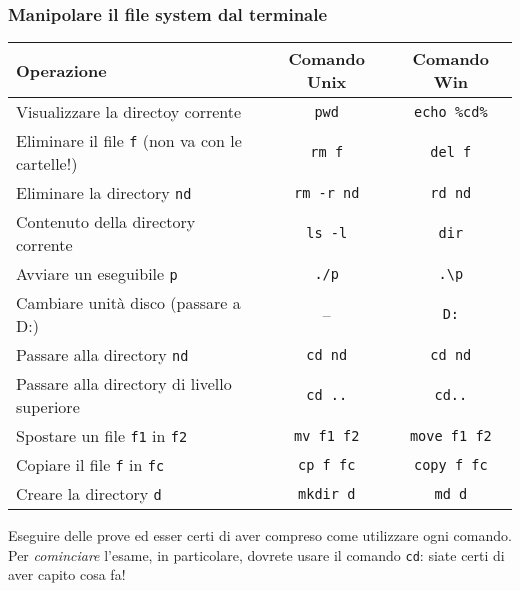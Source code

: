 \documentclass{beamer}
\begin{document}
\begin{frame}[fragile]
\label{slide:commands}
\frametitle{Manipolare il file system dal terminale}
\begin{center}
  \begin{tabular}{| l | c | c |}
    \hline
    \textbf{Operazione} & \textbf{Comando Unix} & \textbf{Comando Win} \\ \hline
    \scriptsize{}Visualizzare la directoy corrente & \texttt{pwd} & \texttt{echo \%cd\%}  \\ \hline
    \scriptsize{}Eliminare il file \texttt{f} (non va con le cartelle!) & \texttt{rm f} & \texttt{del f} \\ \hline
    \scriptsize{}Eliminare la directory \texttt{nd} & \texttt{rm -r nd} & \texttt{rd nd} \\ \hline
    \scriptsize{}Contenuto della directory corrente & \texttt{ls -l} & \texttt{dir} \\ \hline
    \scriptsize{}Avviare un eseguibile \texttt{p} & \texttt{./p} & \texttt{.\textbackslash{}p} \\ \hline
    \scriptsize{}Cambiare unità disco (passare a D:) & -- & \texttt{D:} \\ \hline
    \scriptsize{}Passare alla directory \texttt{nd} & \texttt{cd nd} & \texttt{cd nd} \\ \hline
    \scriptsize{}Passare alla directory di livello superiore & \texttt{cd ..} & \texttt{cd..} \\ \hline
    \scriptsize{}Spostare un file \texttt{f1} in \texttt{f2} & \texttt{mv f1 f2} & \texttt{move f1 f2} \\ \hline
    \scriptsize{}Copiare il file \texttt{f} in \texttt{fc} & \texttt{cp f fc} & \texttt{copy f fc} \\ \hline
    \scriptsize{}Creare la directory \texttt{d} & \texttt{mkdir d} & \texttt{md d} \\ \hline
  \end{tabular}
\end{center}
Eseguire delle prove ed esser certi di aver compreso come utilizzare ogni comando. Per \emph{cominciare} l'esame, in particolare, dovrete usare il comando \texttt{cd}: siate certi di aver capito cosa fa!
\end{frame}
\end{document}
